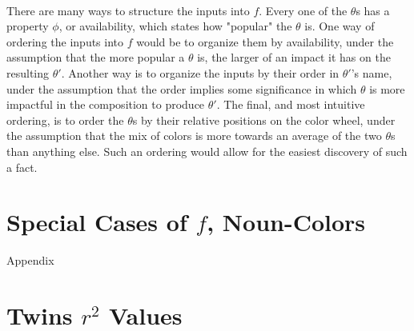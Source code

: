 \documentclass[12pt, letterpaper]{article}
\begin{document}
\paragraph{} There are many ways to structure the inputs into $f$. Every one of the $\theta$s has a property $\phi$, or availability, which states how "popular" the $\theta$ is. One way of ordering the inputs into $f$ would be to organize them by availability, under the assumption that the more popular a $\theta$ is, the larger of an impact it has on the resulting $\theta'$. Another way is to organize the inputs by their order in $\theta'$'s name, under the assumption that the order implies some significance in which $\theta$ is more impactful in the composition to produce $\theta'$. The final, and most intuitive  ordering, is to order the $\theta$s by their relative positions on the color wheel, under the assumption that the mix of colors is more towards an average of the two $\theta$s than anything else. Such an ordering would allow for the easiest discovery of such a fact.

\section{Special Cases of $f$, Noun-Colors}


\pagebreak
\appendix{}
Appendix
\section{Twins $r^2$ Values}
\label{app:r2_values}
\end{document}

